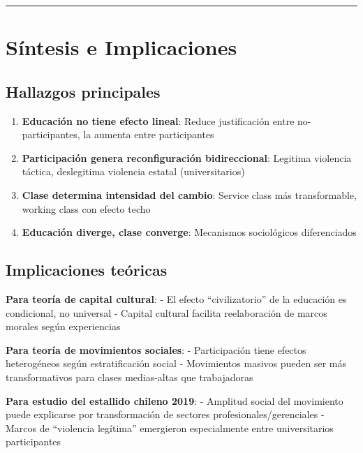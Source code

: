 \documentclass[
  12pt,
]{article}
\begin{document}
\begin{center}\rule{0.5\linewidth}{0.5pt}\end{center}

\section{Síntesis e Implicaciones}\label{suxedntesis-e-implicaciones}

\subsection{Hallazgos principales}\label{hallazgos-principales}

\begin{enumerate}
\def\labelenumi{\arabic{enumi}.}
\item
  \textbf{Educación no tiene efecto lineal}: Reduce justificación entre
  no-participantes, la aumenta entre participantes
\item
  \textbf{Participación genera reconfiguración bidireccional}: Legitima
  violencia táctica, deslegitima violencia estatal (universitarios)
\item
  \textbf{Clase determina intensidad del cambio}: Service class más
  transformable, working class con efecto techo
\item
  \textbf{Educación diverge, clase converge}: Mecanismos sociológicos
  diferenciados
\end{enumerate}

\subsection{Implicaciones teóricas}\label{implicaciones-teuxf3ricas}

\textbf{Para teoría de capital cultural}: - El efecto ``civilizatorio''
de la educación es condicional, no universal - Capital cultural facilita
reelaboración de marcos morales según experiencias

\textbf{Para teoría de movimientos sociales}: - Participación tiene
efectos heterogéneos según estratificación social - Movimientos masivos
pueden ser más transformativos para clases medias-altas que trabajadoras

\textbf{Para estudio del estallido chileno 2019}: - Amplitud social del
movimiento puede explicarse por transformación de sectores
profesionales/gerenciales - Marcos de ``violencia legítima'' emergieron
especialmente entre universitarios participantes
\end{document}
